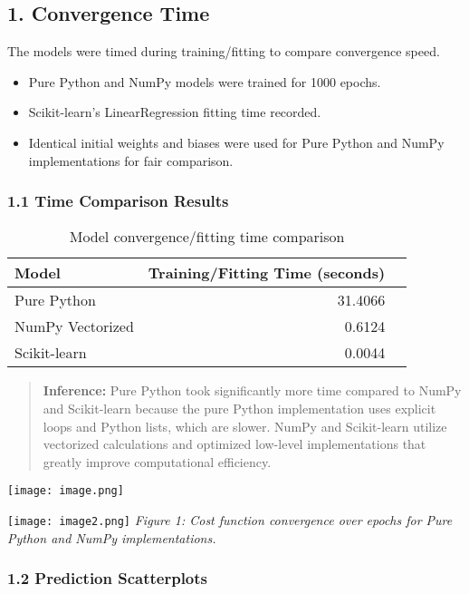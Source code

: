 \documentclass[a4paper,12pt]{article}
\begin{document}
\subsection{1. Convergence Time}
The models were timed during training/fitting to compare convergence speed.
\begin{itemize}
    \item Pure Python and NumPy models were trained for 1000 epochs.
    \item Scikit-learn's LinearRegression fitting time recorded.
    \item Identical initial weights and biases were used for Pure Python and NumPy implementations for fair comparison.
\end{itemize}

\subsubsection{1.1 Time Comparison Results}

\begin{table}[H]
    \centering
    \begin{tabular}{lrr}
    \toprule
    Model & Training/Fitting Time (seconds) \\
    \midrule
    Pure Python & 31.4066 \\
    NumPy Vectorized & 0.6124 \\
    Scikit-learn & 0.0044 \\
    \bottomrule
    \end{tabular}
    \caption{Model convergence/fitting time comparison}
\end{table}

\begin{quote}
\textbf{Inference:} Pure Python took significantly more time compared to NumPy and Scikit-learn because the pure Python implementation uses explicit loops and Python lists, which are slower. NumPy and Scikit-learn utilize vectorized calculations and optimized low-level implementations that greatly improve computational efficiency.
\end{quote}

\texttt{[image: image.png]}

\texttt{[image: image2.png]}
\textit{Figure 1: Cost function convergence over epochs for Pure Python and NumPy implementations.}

\subsubsection{1.2 Prediction Scatterplots}
\end{document}
